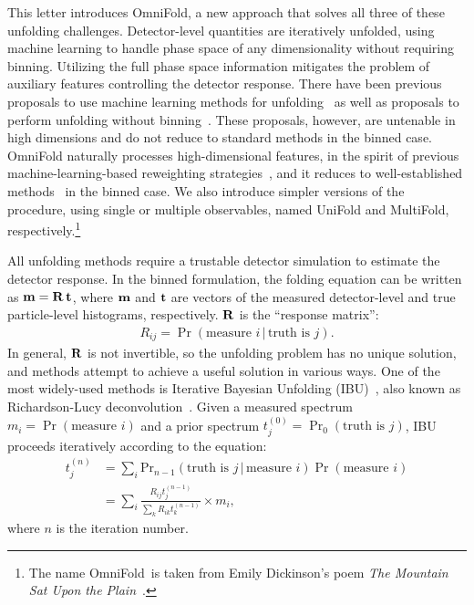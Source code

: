 \documentclass[prl,twocolumn,superscriptaddress,longbibliography,preprintnumbers,nofootinbib]{revtex4-1}
\newcommand{\OmniFold}{{\sc OmniFold}\xspace}
\newcommand{\MultiFold}{{\sc MultiFold}\xspace}
\newcommand{\UniFold}{{\sc UniFold}\xspace}
\begin{document}
%
This letter introduces \OmniFold, a new approach that solves all three of these unfolding challenges.
%
Detector-level quantities are iteratively unfolded, using machine learning to handle phase space of any dimensionality without requiring binning.
%
Utilizing the full phase space information mitigates the problem of auxiliary features controlling the detector response.
%
There have been previous proposals to use machine learning methods for unfolding~\cite{Gagunashvili:2010zw,Glazov:2017vni,Datta:2018mwd} as well as proposals to perform unfolding without binning~\cite{Aslan:2003vu,Lindemann:1995ut,Glazov:2017vni,Datta:2018mwd}.
%
These proposals, however, are untenable in high dimensions and do not reduce to standard methods in the binned case.
%
\OmniFold naturally processes high-dimensional features, in the spirit of previous machine-learning-based reweighting strategies~\cite{Martschei_2012,Rogozhnikov:2016bdp,Aaij:2017awb,Aaboud:2018htj,Andreassen:2018apy,Andreassen:2019nnm}, and it reduces to well-established methods~\cite{DAgostini:1994fjx} in the binned case.
%
We also introduce simpler versions of the procedure, using single or multiple observables, named \UniFold and \MultiFold, respectively.\footnote{The name \OmniFold\ is taken from Emily Dickinson's poem \textit{The Mountain Sat Upon the Plain}~\cite{dickinson}.}




All unfolding methods require a trustable detector simulation to estimate the detector response.
%
In the binned formulation, the folding equation can be written as ${\bf m} = {\bf R}\,{\bf t}$, where ${\bf m}$ and ${\bf t}$ are vectors of the measured detector-level and true particle-level histograms, respectively.
%
$\bf R$ is the ``response matrix'':
\begin{align}
    R_{ij} = \Pr(\text{measure $i$} \,|\, \text{truth is $j$}).
\end{align}
%
In general, ${\bf R}$ is not invertible, so the unfolding problem has no unique solution, and methods attempt to achieve a useful solution in various ways.
%
One of the most widely-used methods is Iterative Bayesian Unfolding (IBU)~\cite{DAgostini:1994fjx}, also known as Richardson-Lucy deconvolution~\cite{1974AJ.....79..745L,Richardson:72}.
%
Given a measured spectrum $m_i = \Pr(\text{measure $i$})$ and a prior spectrum $t_j^{(0)} = \Pr_0(\text{truth is $j$})$, IBU proceeds iteratively according to the equation:
%
\begin{align}
  \nonumber
  t_j^{(n)} & = \sum_i \text{Pr}_{n-1}(\text{truth is $j$} \,|\, \text{measure $i$})
 \Pr(\text{measure $i$}) \\
  &= \sum_i \frac{R_{ij} t_j^{(n-1)}}{\sum_k R_{ik} t_k^{(n-1)}} \times m_i,
  \label{eq:unfolding}
\end{align}
%
where $n$ is the iteration number.
%
\end{document}
